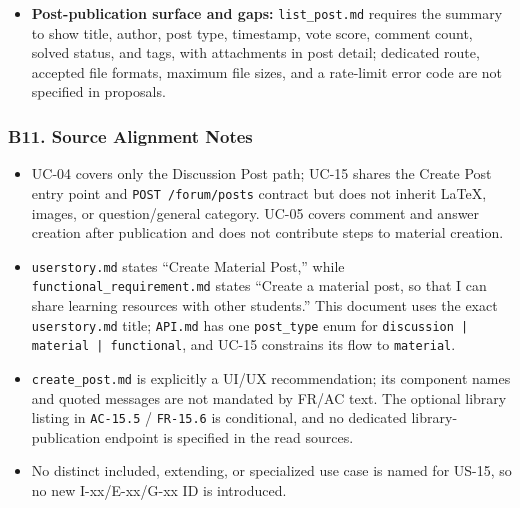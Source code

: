 \documentclass[12pt]{article}
\begin{document}
\begin{itemize}
\item \textbf{Post-publication surface and gaps:} \texttt{list\_post.md} requires the summary to show title, author, post type, timestamp, vote score, comment count, solved status, and tags, with attachments in post detail; dedicated route, accepted file formats, maximum file sizes, and a rate-limit error code are not specified in proposals.
\end{itemize}
\par\medskip

\hypertarget{sec:b11-source-alignment-notes}{}
\subsubsection*{B11. Source Alignment Notes}
\par\medskip

\begin{itemize}
\item UC-04 covers only the Discussion Post path; UC-15 shares the Create Post entry point and \texttt{POST /forum/posts} contract but does not inherit LaTeX, images, or question/general category. UC-05 covers comment and answer creation after publication and does not contribute steps to material creation.
\item \texttt{userstory.md} states “Create Material Post,” while \texttt{functional\_requirement.md} states “Create a material post, so that I can share learning resources with other students.” This document uses the exact \texttt{userstory.md} title; \texttt{API.md} has one \texttt{post\_type} enum for \texttt{discussion | material | functional}, and UC-15 constrains its flow to \texttt{material}.
\item \texttt{create\_post.md} is explicitly a UI/UX recommendation; its component names and quoted messages are not mandated by FR/AC text. The optional library listing in \texttt{AC-15.5} / \texttt{FR-15.6} is conditional, and no dedicated library-publication endpoint is specified in the read sources.
\item No distinct included, extending, or specialized use case is named for US-15, so no new I-xx/E-xx/G-xx ID is introduced.
\end{itemize}
\par\medskip

\par\medskip
\hypertarget{sec:ui-prototype-specimens}{}
\end{document}
